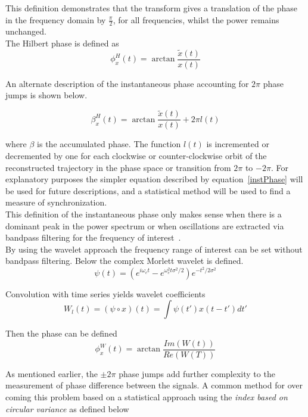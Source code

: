 \documentclass[]{article}
\begin{document}
This definition demonstrates that the transform gives a translation
of the phase in the frequency domain by $\frac{\pi}{2}$, for all
frequencies, whilst the power remains unchanged.\\

The Hilbert phase is defined as
\begin{equation}
\phi_x^{H}(t) = \arctan\frac{\tilde{x}(t)}{x(t)}
\label{instPhase}
\end{equation}

An alternate description of the instantaneous phase accounting for
$2\pi$ phase jumps is shown below.

\begin{equation}
\beta_x^{H}(t) = \arctan\frac{\tilde{x}(t)}{x(t)}+2\pi l(t)
\end{equation}

where $\beta$ is the accumulated phase. The function $l(t)$ is
incremented or decremented by one for each clockwise or
counter-clockwise orbit of the reconstructed trajectory in the phase
space or transition from $2\pi$ to $-2\pi$. For explanatory purposes
the simpler equation described by equation~\ref{instPhase} will be
used for future descriptions, and a statistical method will be used
to find
a measure of synchronization.\\

This definition of the instantaneous phase only makes sense when
there is a dominant peak in the power spectrum or when oscillations
are extracted via bandpass
filtering for the frequency of interest~\cite{Rosenblum2004}.\\

By using the wavelet approach the frequency range of interest can be
set without bandpass filtering. Below the complex Morlett wavelet is
defined.
\begin{equation}
\psi(t) =
(e^{i\omega_ct}-e^{\omega_c^2t\sigma^2/2})e^{-t^2/2\sigma^2}
\end{equation}

Convolution with time series yields wavelet coefficients
\begin{equation}
W_l(t) = (\psi\circ x)(t) = \int\psi(t')x(t-t')dt'
\end{equation}

Then the phase can be defined
\begin{equation}
\phi_x^W(t)=\arctan\frac{Im(W(t))}{Re(W(T))}
\end{equation}

As mentioned earlier, the $\pm2\pi$ phase jumps add further
complexity to the measurement of phase difference between the
signals. A common method for over coming this problem based on a
statistical approach using the \emph{index based on circular
variance} as defined below
\end{document}

